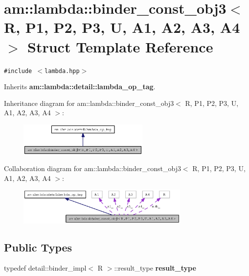 \section{am::lambda::binder\_\-const\_\-obj3$<$ R, P1, P2, P3, U, A1, A2, A3, A4 $>$ Struct Template Reference}
\label{structam_1_1lambda_1_1binder__const__obj3}
{\tt \#include $<$lambda.hpp$>$}

Inherits {\bf am::lambda::detail::lambda\_\-op\_\-tag}.

Inheritance diagram for am::lambda::binder\_\-const\_\-obj3$<$ R, P1, P2, P3, U, A1, A2, A3, A4 $>$:\begin{figure}[H]
\begin{center}
\leavevmode
\includegraphics[width=182pt]{structam_1_1lambda_1_1binder__const__obj3__inherit__graph}
\end{center}
\end{figure}
Collaboration diagram for am::lambda::binder\_\-const\_\-obj3$<$ R, P1, P2, P3, U, A1, A2, A3, A4 $>$:\begin{figure}[H]
\begin{center}
\leavevmode
\includegraphics[width=240pt]{structam_1_1lambda_1_1binder__const__obj3__coll__graph}
\end{center}
\end{figure}
\subsection*{Public Types}
\begin{CompactItemize}
\item 
typedef detail::binder\_\-impl$<$ R $>$::result\_\-type \textbf{result\_\-type}\label{structam_1_1lambda_1_1binder__const__obj3_d81d5d7d42c92cc8cccdcb8e66f75d5f}

\end{CompactItemize}
